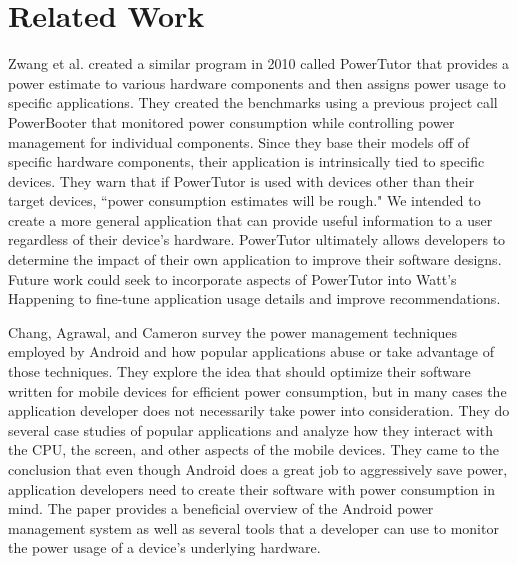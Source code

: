 \section{Related Work}
\label{sec:related}
Zwang et al.\cite{Zhang:2010:AOP:1878961.1878982} created a similar program in 2010 called PowerTutor that provides a power estimate to various hardware components and then assigns power usage to specific applications.  
They created the benchmarks using a previous project call PowerBooter that monitored power consumption while controlling power management for individual components. 
Since they base their models off of specific hardware components, their application is intrinsically tied to specific devices.
They warn that if PowerTutor is used with devices other than their target devices, ``power consumption estimates will be rough."
We intended to create a more general application that can provide useful information to a user regardless of their device's hardware. 
PowerTutor ultimately allows developers to determine the impact of their own application to improve their software designs.  
Future work could seek to incorporate aspects of PowerTutor into Watt's Happening to fine-tune application usage details and improve recommendations.

Chang, Agrawal, and Cameron survey the power management techniques employed by Android and how popular applications abuse or take advantage of those techniques\cite{energy-aware}. 
They explore the idea that should optimize their software written for mobile devices for efficient power consumption, but in many cases the application developer does not necessarily take power into consideration. 
They do several case studies of popular applications and analyze how they interact with the CPU, the screen, and other aspects of the mobile devices. 
They came to the conclusion that even though Android does a great job to aggressively save power, application developers need to create their software with power consumption in mind. 
The paper provides a beneficial overview of the Android power management system as well as several tools that a developer can use to monitor the power usage of a device's underlying hardware. 

